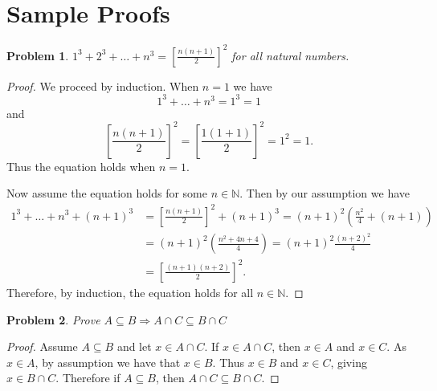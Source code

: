 \documentclass[12pt]{article}
\newcommand{\cont}{\subseteq}
\newtheorem{problem}{Problem}
\numberwithin{problem}{section} %
\theoremstyle{remark}  %
\begin{document}
\section{Sample Proofs}
\begin{problem} $1^3+2^3+\ldots +n^3 = \left[ \frac{n(n+1)}{2}\right]^2$  for all natural numbers. 

\end{problem}
 
\begin{proof}
We proceed by induction. When $n=1$ we have 
$$
1^3 + \ldots + n^3 = 1^3 =1
$$
and
$$
\left[ \frac{n(n+1)}{2}\right]^2=\left[ \frac{1(1+1)}{2}\right]^2 = 1^2 =1.
$$
Thus the equation holds when $n=1$.

Now assume the equation holds for some $n \in \mathbb N$. Then by our assumption we have
\begin{align*}
1^3 + \ldots + n^3 + (n+1)^3& =   \left[ \frac{n(n+1)}{2}\right]^2 + (n+1)^3 = (n+1)^2\left( \frac{n^2}{4} + (n+1)\right) \\
&=(n+1)^2\left( \frac{n^2+4n+4}{4} \right) = (n+1)^2\frac{(n+2)^2}{4}  \\ &=  \left[ \frac{(n+1)(n+2)}{2}\right]^2.
\end{align*}
Therefore, by induction, the equation holds for all $n\in \mathbb N$.
\end{proof}

\begin{problem} Prove $A \subseteq B \Rightarrow A \cap C \cont B \cap C$
\end{problem}
\begin{proof} Assume $A \cont B $ and let $x\in A \cap C$. If $x \in  A \cap C$, then $x\in A$ and $x \in C$. As $x\in A$, by assumption we have that $x \in B$. Thus $x \in B$ and $x \in C$, giving $x\in B \cap C$. Therefore if $A \subseteq B $, then $A \cap C \cont B \cap C$.
\end{proof}

 
\fi
\end{document}
